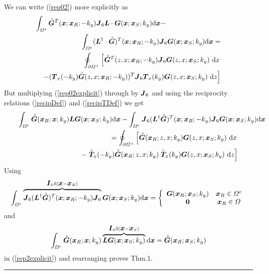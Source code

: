We can write (\ref{rep02}) more explicitly as
\begin{eqnarray} \label{rep02explicit}
\lefteqn{
\int_{{\mit \Omega}^{e}} {\rf{\bmi G}}{}^{T} ({\bmi x};{\bmi 
x}_{R};-k_y){\bmi J}_{6}{\bmi L}\cdot{{\bmi G}}({\bmi 
x};{\bmi x}_{S};k_y) {\rm d}{\bmi x} -
}\nonumber\\
&&
\int_{{\mit \Omega}^{e}} ({\bmi L}^{\dagger}\cdot{\rf{\bmi G}})^{T}({\bmi x};
{\bmi x}_{R};-k_y){\bmi J}_{6}{{\bmi G}}({\bmi 
x};{\bmi x}_{S};k_y) {\rm d}{\bmi x}=\nonumber\\
&&
\oint_{\partial {\mit \Omega}^{+}} \left[ {\rf{\bmi G}}{}^{T}({z, x};{\bmi 
x}_{R};-k_y) {\bmi J}_{6} 
{{\bmi G}}({z, x};{\bmi x}_{S};k_y) \  {\rm d}x\right.\nonumber\\
&&\left. 
- ({\bmi T}_x(-k_y){\rf{\bmi G}}({z, x};{\bmi x}_{R};-k_y))^{T} {\bmi J}_{6} 
{\bmi T}_x(k_y){{\bmi G}}({z, x};{\bmi x}_{S};k_y) \ {\rm d}z \right]
\end{eqnarray} 
But multiplying (\ref{rep02explicit}) through by ${\mbox{\boldmath$\mit J$\unboldmath}}_{6}$ and using 
the reciprocity relations (\ref{recipDef}) and (\ref{recipTDef}) we get
\begin{eqnarray} \label{rep2explicit}
\lefteqn{
\int_{{\mit \Omega}^{e}} {\rf{\bmi G}}({\bmi x}_{R};{\bmi x};k_y){\bmi L}{{\bmi G}}({\bmi 
x};{\bmi x}_{S};k_y) {\rm d}{\bmi x} -
\int_{{\mit \Omega}^{e}} {\bmi J}_{6} ({\bmi L}^{\dagger}{\rf{\bmi G}})^{T}(
{\bmi x};{\bmi x}_{R};-k_y){\bmi J}_{6}{{\bmi G}}({\bmi 
x};{\bmi x}_{S};k_y) {\rm d}{\bmi x}}\nonumber\\
&&=
\oint_{\partial {\mit \Omega}^{+}} \left[ {\rf{\bmi G}}({\bmi x}_{R};{z, x};k_y) 
{{\bmi G}}({z, x};{\bmi x}_{S};k_y) \  {\rm d}x \right.\nonumber\\
&&\qquad\qquad\qquad\qquad
\left.
- \stackrel{\scriptscriptstyle _s}{\bmi T}{}_{\!\!\! x}(-k_y){\rf{\bmi 
G}}({\bmi x}_{R};{z, x};k_y)  
\stackrel{\scriptscriptstyle _r}{\bmi T}{}_{\!\!\! x}(k_y){{\bmi G}}({z, 
x};{\bmi x}_{S};k_y) \ {\rm d}z \right]
\end{eqnarray}
Using 
\[
\int_{{\mit \Omega}^{e}} \overbrace{{\mbox{\boldmath$\mit J$\unboldmath}}_{6} ({\mbox{\boldmath$\mit L$\unboldmath}}^{\dagger}{\stackrel{\scriptscriptstyle _{\,\,\circ}}{ \mbox{\boldmath$\mit G$\unboldmath}}})^{T}(
{\mbox{\boldmath$\mit x$\unboldmath}};{\mbox{\boldmath$\mit x$\unboldmath}}_{R};-k_y){\mbox{\boldmath$\mit J$\unboldmath}}_{6}}^{{\mbox{\boldmath$\mit I$\unboldmath}}_{6}\delta({\mbox{\boldmath$\mit x$\unboldmath}}-{\mbox{\boldmath$\mit x$\unboldmath}}_R)}{{\mbox{\boldmath$\mit G$\unboldmath}}}({\mbox{\boldmath$\mit x$\unboldmath}};{\mbox{\boldmath$\mit x$\unboldmath}}_{S};k_y) {\rm d}{\mbox{\boldmath$\mit x$\unboldmath}}=\left\{
\begin{array}{cc}
{{\mbox{\boldmath$\mit G$\unboldmath}}}({\mbox{\boldmath$\mit x$\unboldmath}}_{R};{\mbox{\boldmath$\mit x$\unboldmath}}_{S};k_y)& {\mbox{\boldmath$\mit x$\unboldmath}}_{R}\in {\mit \Omega}^{e}\\
{\bf 0}&{\mbox{\boldmath$\mit x$\unboldmath}}_{R}\in {\mit \Omega}
\end{array}  \right.
\]
and
\[
\int_{{\mit \Omega}^{e}} {\stackrel{\scriptscriptstyle _{\,\,\circ}}{ \mbox{\boldmath$\mit G$\unboldmath}}}({\mbox{\boldmath$\mit x$\unboldmath}}_{R};{\mbox{\boldmath$\mit x$\unboldmath}};k_y)
\overbrace{{\mbox{\boldmath$\mit L$\unboldmath}}{{\mbox{\boldmath$\mit G$\unboldmath}}}({\mbox{\boldmath$\mit x$\unboldmath}};{\mbox{\boldmath$\mit x$\unboldmath}}_{S};k_y)}^{{\mbox{\boldmath$\mit I$\unboldmath}}_{6}\delta({\mbox{\boldmath$\mit x$\unboldmath}}-{\mbox{\boldmath$\mit x$\unboldmath}}_S)} {\rm d}{\mbox{\boldmath$\mit x$\unboldmath}}=
{\stackrel{\scriptscriptstyle _{\,\,\circ}}{ \mbox{\boldmath$\mit G$\unboldmath}}}({\mbox{\boldmath$\mit x$\unboldmath}}_{R};{\mbox{\boldmath$\mit x$\unboldmath}}_{S};k_y)
\]
in (\ref{rep2explicit}) and rearranging proves Thm.1.
\hfill \rule{11 pt}{11 pt}


